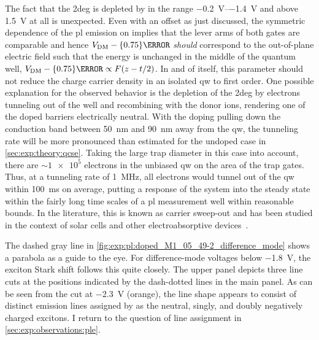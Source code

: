 The fact that the \gls{2deg} is depleted by \VDM in the range \qtyrange{-0.2}{-1.4}{\volt} and above \qty{1.5}{\volt} at all is unexpected.
Even with an offset as just discussed, the symmetric dependence of the \gls{pl} emission on \VDM implies that the lever arms of both gates are comparable and hence $\VDM - \qty{0.75}{\volt}$ \emph{should} correspond to the out-of-plane electric field such that the energy is unchanged in the middle of the quantum well, $\VDM - \qty{0.75}{\volt} \propto F(z-t/2)$.
In and of itself, this parameter should not reduce the charge carrier density in an isolated \gls{qw} to first order.
One possible explanation for the observed behavior is the depletion of the \gls{2deg} by electrons tunneling out of the well and recombining with the donor ions, rendering one of the doped barriers electrically neutral.
With the doping pulling down the conduction band between \qty{50}{\nano\meter} and \qty{90}{\nano\meter} away from the \gls{qw}, the tunneling rate will be more pronounced than estimated for the undoped case in \cref{sec:exp:theory:qcse}.
Taking the large trap diameter in this case into account, there are $\sim\num[print-unit-mantissa=false]{1e5}$ electrons in the unbiased \gls{qw} on the area of the trap gates.
Thus, at a tunneling rate of \qty{1}{\mega\hertz}, all electrons would tunnel out of the \gls{qw} within \qty{100}{\milli\second} on average, putting a response of the system into the steady state within the fairly long time scales of a \gls{pl} measurement
well within reasonable bounds. %
In the literature, this is known as carrier sweep-out and has been studied in the context of solar cells and other electroabsorptive devices~\cite{Larsson1988,Schneider1988,Fox1991}.

The dashed gray line in \cref{fig:exp:pl:doped_M1_05_49-2_difference_mode} shows a parabola as a guide to the eye.
For difference-mode voltages below \qty{-1.8}{\volt}, the exciton Stark shift follows this quite closely.
The upper panel depicts three line cuts at the positions indicated by the dash-dotted lines in the main panel.
As can be seen from the cut at \qty{-2.3}{\volt} (orange), the line shape appears to consist of distinct emission lines assigned by \citet{Descamps2021} as the neutral, singly, and doubly negatively charged excitons. %
I return to the question of line assignment in \cref{sec:exp:observations:ple}.

